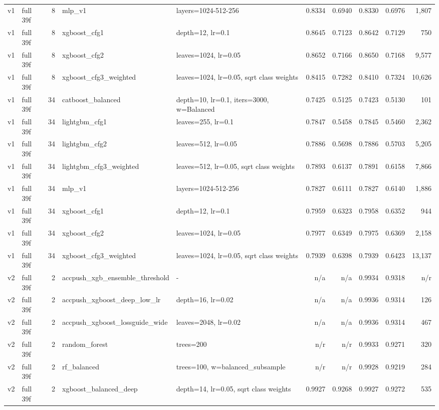 {\begin{longtable}{llrp{3.2cm}p{4.4cm}rrrrr}
v1 & full 39f & 8 & mlp\_v1 & layers=1024-512-256 & 0.8334 & 0.6940 & 0.8330 & 0.6976 & 1,807 \\
v1 & full 39f & 8 & xgboost\_cfg1 & depth=12, lr=0.1 & 0.8645 & 0.7123 & 0.8642 & 0.7129 & 750 \\
v1 & full 39f & 8 & xgboost\_cfg2 & leaves=1024, lr=0.05 & 0.8652 & 0.7166 & 0.8650 & 0.7168 & 9,577 \\
v1 & full 39f & 8 & xgboost\_cfg3\_weighted & leaves=1024, lr=0.05, sqrt class weights & 0.8415 & 0.7282 & 0.8410 & 0.7324 & 10,626 \\
v1 & full 39f & 34 & catboost\_balanced & depth=10, lr=0.1, iters=3000, w=Balanced & 0.7425 & 0.5125 & 0.7423 & 0.5130 & 101 \\
v1 & full 39f & 34 & lightgbm\_cfg1 & leaves=255, lr=0.1 & 0.7847 & 0.5458 & 0.7845 & 0.5460 & 2,362 \\
v1 & full 39f & 34 & lightgbm\_cfg2 & leaves=512, lr=0.05 & 0.7886 & 0.5698 & 0.7886 & 0.5703 & 5,205 \\
v1 & full 39f & 34 & lightgbm\_cfg3\_weighted & leaves=512, lr=0.05, sqrt class weights & 0.7893 & 0.6137 & 0.7891 & 0.6158 & 7,866 \\
v1 & full 39f & 34 & mlp\_v1 & layers=1024-512-256 & 0.7827 & 0.6111 & 0.7827 & 0.6140 & 1,886 \\
v1 & full 39f & 34 & xgboost\_cfg1 & depth=12, lr=0.1 & 0.7959 & 0.6323 & 0.7958 & 0.6352 & 944 \\
v1 & full 39f & 34 & xgboost\_cfg2 & leaves=1024, lr=0.05 & 0.7977 & 0.6349 & 0.7975 & 0.6369 & 2,158 \\
v1 & full 39f & 34 & xgboost\_cfg3\_weighted & leaves=1024, lr=0.05, sqrt class weights & 0.7939 & 0.6398 & 0.7939 & 0.6423 & 13,137 \\
v2 & full 39f & 2 & accpush\_xgb\_ensemble\_threshold & - & n/a & n/a & 0.9934 & 0.9318 & n/r \\
v2 & full 39f & 2 & accpush\_xgboost\_deep\_low\_lr & depth=16, lr=0.02 & n/a & n/a & 0.9936 & 0.9314 & 126 \\
v2 & full 39f & 2 & accpush\_xgboost\_lossguide\_wide & leaves=2048, lr=0.02 & n/a & n/a & 0.9936 & 0.9314 & 467 \\
v2 & full 39f & 2 & random\_forest & trees=200 & n/r & n/r & 0.9933 & 0.9271 & 320 \\
v2 & full 39f & 2 & rf\_balanced & trees=100, w=balanced\_subsample & n/r & n/r & 0.9928 & 0.9219 & 284 \\
v2 & full 39f & 2 & xgboost\_balanced\_deep & depth=14, lr=0.05, sqrt class weights & 0.9927 & 0.9268 & 0.9927 & 0.9272 & 535 \\

\end{longtable}}
